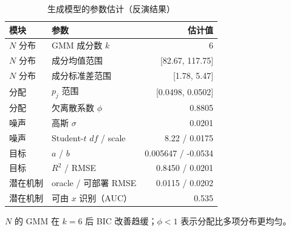 \begin{table}[htbp]
\centering
\caption{生成模型的参数估计（反演结果）}
\label{tab:generative}
\small
\begin{tabular}{llr}
\toprule
模块 & 参数 & 估计值 \\
\midrule
$N$ 分布 & GMM 成分数 $k$ & 6 \\
$N$ 分布 & 成分均值范围 & [82.67, 117.75] \\
$N$ 分布 & 成分标准差范围 & [1.78, 5.47] \\
分配 & $p_j$ 范围 & [0.0498, 0.0502] \\
分配 & 欠离散系数 $\phi$ & 0.8805 \\
噪声 & 高斯 $\sigma$ & 0.0201 \\
噪声 & Student-$t$ $df$ / scale & 8.22 / 0.0175 \\
目标 & $a$ / $b$ & 0.005647 / -0.0534 \\
目标 & $R^2$ / RMSE & 0.8450 / 0.0201 \\
潜在机制 & oracle / 可部署 RMSE & 0.0115 / 0.0202 \\
潜在机制 & 可由 $x$ 识别（AUC） & 0.535 \\
\bottomrule
\end{tabular}
\par\vspace{2pt}\footnotesize $N$ 的 GMM 在 $k=6$ 后 BIC 改善趋缓；$\phi<1$ 表示分配比多项分布更均匀。
\end{table}
